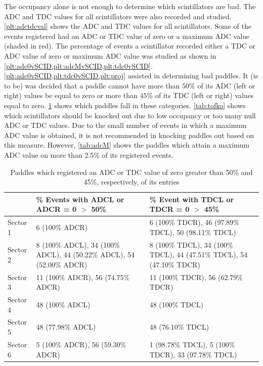 The occupancy alone is not enough to determine which scintillators are bad. The ADC and TDC values for all scintillators were also recorded and studied. \ref{plt:adctdcval} shows the ADC and TDC values for all scintillators. Some of the events registered had an ADC or TDC value of zero or a maximum ADC value (shaded in red). The percentage of events a scintillator recorded either a TDC or ADC value of zero or maximum ADC value was studied as shown in \ref{plt:adc0vSCID,plt:adcMvSCID,plt:tdc0vSCID}. \ref{plt:adc0vSCID,plt:tdc0vSCID,plt:proj} assisted in determining bad paddles. It (is to be) was decided that a paddle cannot have more than $50\%$ of its ADC (left or right) values be equal to zero or more than $45\%$ of its TDC (left or right) values equal to zero. \ref{tab:adctdc0} shows which paddles fall in these categories. \ref{tab:tofko} shows which scintillators should be knocked out due to low occupancy or too many null ADC or TDC values. Due to the small number of events in which a maximum ADC value is obtained, it is not recommended in knocking paddles out based on this measure. However, \ref{tab:adcM} shows the paddles which attain a maximum ADC value on more than $2.5\%$ of its registered events.

\begin{table}
\begin{tabular}[!htbp]{l|p{}|p{}} %
 &  \% Events with ADCL or ADCR = 0 \( > \) 50\% &  \% Event with TDCL or TDCR = 0 \( > \) 45\% \\ 
\hline
Sector 1 & 6 (100\% ADCR) & 6 (100\% TDCR), 46 (97.89\% TDCL), 50 (98.11\% TDCL) \\
Sector 2 & 8 (100\% ADCL), 34 (100\% ADCL), 44 (50.22\% ADCL), 54 (52.00\% ADCR) &  8 (100\% TDCL), 34 (100\% TDCL), 44 (47.51\% TDCL), 54 (47.10\% TDCR)\\
Sector 3 & 11 (100\% ADCR), 56 (74.75\% ADCR) & 11 (100\% TDCR), 56 (62.79\% TDCR)\\
Sector 4 & 48 (100\% ADCL) & 48 (100\% TDCL) \\
Sector 5 & 48 (77.98\% ADCL) & 48 (76.10\% TDCL)\\
Sector 6 & 5 (100\% ADCR), 56 (59.30\% ADCR) & 1 (98.78\% TDCL), 5 (100\% TDCR), 33 (97.78\% TDCL)
\end{tabular}
\caption{Paddles which registered an ADC or TDC value of zero greater than 50\% and 45\%, respectively, of its entries}
\label{tab:adctdc0}
\end{table}


